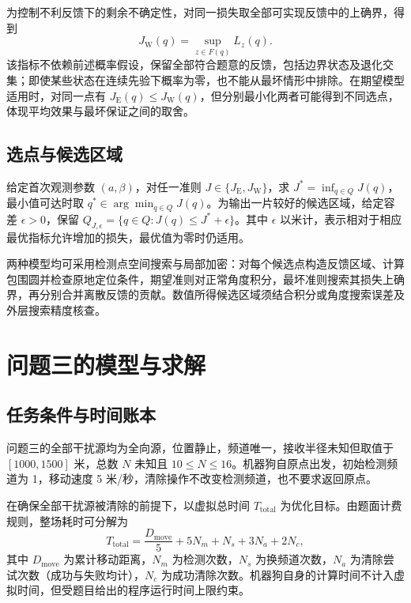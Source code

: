 \documentclass[UTF8,a4paper,zihao=-4,fontset=none]{ctexart}
\begin{document}
为控制不利反馈下的剩余不确定性，对同一损失取全部可实现反馈中的上确界，得到
\begin{equation}
 J_{\mathrm W}(q)=\sup_{z\in F(q)}L_z(q).
\label{eq:q2-pair-worst-objective}
\end{equation}
该指标不依赖前述概率假设，保留全部符合题意的反馈，包括边界状态及退化交集；即使某些状态在连续先验下概率为零，也不能从最坏情形中排除。在期望模型适用时，对同一点有 \(J_{\mathrm E}(q)\le J_{\mathrm W}(q)\)，但分别最小化两者可能得到不同选点，体现平均效果与最坏保证之间的取舍。

\subsection{选点与候选区域}

给定首次观测参数 \((a,\beta)\)，对任一准则 \(J\in\{J_{\mathrm E},J_{\mathrm W}\}\)，求 \(J^*=\inf_{q\in Q}J(q)\)，最小值可达时取 \(q^*\in\arg\min_{q\in Q}J(q)\)。为输出一片较好的候选区域，给定容差 \(\epsilon>0\)，保留 \(Q_{J,\epsilon}=\{q\in Q:J(q)\le J^*+\epsilon\}\)。其中 \(\epsilon\) 以米计，表示相对于相应最优指标允许增加的损失，最优值为零时仍适用。

两种模型均可采用检测点空间搜索与局部加密：对每个候选点构造反馈区域、计算包围圆并检查原地定位条件，期望准则对正常角度积分，最坏准则搜索其损失上确界，再分别合并离散反馈的贡献。数值所得候选区域须结合积分或角度搜索误差及外层搜索精度核查。




\section{问题三的模型与求解}

\subsection{任务条件与时间账本}

问题三的全部干扰源均为全向源，位置静止，频道唯一，接收半径未知但取值于 \([1000,1500]\) 米，总数 \(N\) 未知且 \(10\le N\le16\)。机器狗自原点出发，初始检测频道为 1，移动速度 5 米/秒，清除操作不改变检测频道，也不要求返回原点。

在确保全部干扰源被清除的前提下，以虚拟总时间 \(T_{\mathrm{total}}\) 为优化目标。由题面计费规则，整场耗时可分解为
\begin{equation}
  T_{\mathrm{total}}=\frac{D_{\mathrm{move}}}{5}+5N_m+N_s+3N_a+2N_c,
  \label{eq:q3-ledger}
\end{equation}
其中 \(D_{\mathrm{move}}\) 为累计移动距离，\(N_m\) 为检测次数，\(N_s\) 为换频道次数，\(N_a\) 为清除尝试次数（成功与失败均计），\(N_c\) 为成功清除次数。机器狗自身的计算时间不计入虚拟时间，但受题目给出的程序运行时间上限约束。
\end{document}
